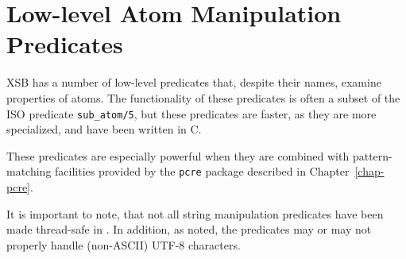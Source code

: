 
\section{Low-level Atom Manipulation Predicates}
\label{sec-strings}

XSB has a number of low-level predicates that, despite their names,
examine properties of atoms.  The functionality of these predicates is
often a subset of the ISO predicate {\tt sub\_atom/5}, but these
predicates are faster, as they are more specialized, and have been
written in C.

These predicates are especially powerful when they are combined with
pattern-matching facilities provided by the {\tt pcre} package
described in Chapter~\ref{chap-pcre}.

It is important to note, that not all string manipulation predicates
have been made thread-safe in \version{}.  In addition, as noted, the
predicates may or may not properly handle (non-ASCII) UTF-8
characters.

